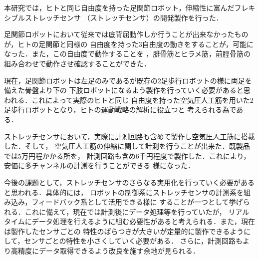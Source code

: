 本研究では，ヒトと同じ自由度を持った足関節ロボット，伸縮性に富んだフレキシブルストレッチセンサ
（ストレッチセンサ）の開発製作を行った．

足関節ロボットにおいて従来では底背屈動作しか行うことが出来なかったものが，ヒトの足関節と同様の
自由度を持った3自由度の動きをすることが，可能になった．また，この自由度で動作することを
，腓骨筋とヒラメ筋，前脛骨筋の組み合わせで動作させ確認することができた．

現在，足関節ロボットは左足のみであるが既存の2足歩行ロボットの様に両足を備えた骨盤より下の
下肢ロボットになるよう製作を行っていく必要があると思われる．これによって実際のヒトと同じ
自由度を持った空気圧人工筋を用いた2足歩行ロボットとなり，ヒトの運動戦略の解析に役立つと
考えられる為である．

ストレッチセンサにおいて，実際に計測回路も含めて製作し空気圧人工筋に搭載した．そして，
空気圧人工筋の伸縮に関して計測を行うことが出来た．既製品では5万円程かかる所を，
計測回路も含め6千円程度で製作した．これにより，安価に多チャンネルの計測を行うことができる
様になった．

今後の課題として，ストレッチセンサのさらなる実用化を行っていく必要があると思われる．具体的には，
ロボットの制御系にストレッチセンサの計測系を組み込み，フィードバック系として活用できる様に
することが一つとして挙げられる．これに備えて，現在では計測後にデータ処理等を行っていたが，
リアルタイムにデータ処理を行えるように組む必要性があると考えられる．また，現在は製作したセンサごとの
特性のばらつきが大きいが定量的に製作できるようにして，センサごとの特性を小さくしていく必要がある．
さらに，計測回路もより高精度にデータ取得できるよう改良を施す余地が見られる．